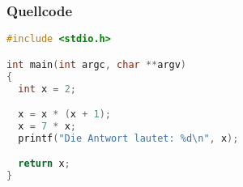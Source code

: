 \begin{frame}[containsverbatim]
\frametitle{Quellcode}

\begingroup
\small
\begin{lstlisting}[style=numberedblock,language=C]
#include <stdio.h>

int main(int argc, char **argv)
{
  int x = 2;

  x = x * (x + 1);
  x = 7 * x;
  printf("Die Antwort lautet: %d\n", x);

  return x;
}
\end{lstlisting}
\endgroup
\end{frame}
